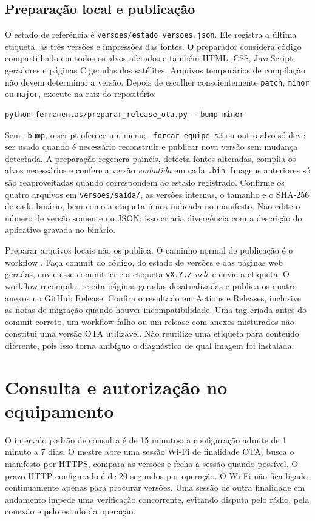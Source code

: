 \subsection{Preparação local e publicação}
O estado de referência é \texttt{versoes/estado\_versoes.json}. Ele registra a última etiqueta, as três versões e impressões das fontes. O preparador considera código compartilhado em todos os alvos afetados e também HTML, CSS, JavaScript, geradores e páginas C geradas dos satélites. Arquivos temporários de compilação não devem determinar a versão. Depois de escolher conscientemente \texttt{patch}, \texttt{minor} ou \texttt{major}, execute na raiz do repositório:
\begin{lstlisting}[caption={Preparação local do conjunto OTA}]
python ferramentas/preparar_release_ota.py --bump minor
\end{lstlisting}
Sem \texttt{--bump}, o script oferece um menu; \texttt{--forcar equipe-s3} ou outro alvo só deve ser usado quando é necessário reconstruir e publicar nova versão sem mudança detectada. A preparação regenera painéis, detecta fontes alteradas, compila os alvos necessários e confere a versão \emph{embutida} em cada \texttt{.bin}. Imagens anteriores só são reaproveitadas quando correspondem ao estado registrado. Confirme os quatro arquivos em \texttt{versoes/saida/}, as versões internas, o tamanho e o SHA-256 de cada binário, bem como a etiqueta única indicada no manifesto. Não edite o número de versão somente no JSON: isso criaria divergência com a descrição do aplicativo gravada no binário.

Preparar arquivos locais não os publica. O caminho normal de publicação é o workflow . Faça commit do código, do estado de versões e das páginas web geradas, envie esse commit, crie a etiqueta \texttt{vX.Y.Z} \emph{nele} e envie a etiqueta. O workflow recompila, rejeita páginas geradas desatualizadas e publica os quatro anexos no GitHub Release. Confira o resultado em Actions e Releases, inclusive as notas de migração quando houver incompatibilidade. Uma tag criada antes do commit correto, um workflow falho ou um release com anexos misturados não constitui uma versão OTA utilizável. Não reutilize uma etiqueta para conteúdo diferente, pois isso torna ambíguo o diagnóstico de qual imagem foi instalada.

\section{Consulta e autorização no equipamento}
O intervalo padrão de consulta é de 15 minutos; a configuração admite de 1 minuto a 7 dias. O mestre abre uma sessão Wi-Fi de finalidade OTA, busca o manifesto por HTTPS, compara as versões e fecha a sessão quando possível. O prazo HTTP configurado é de 20 segundos por operação. O Wi-Fi não fica ligado continuamente apenas para procurar versões. Uma sessão de outra finalidade em andamento impede uma verificação concorrente, evitando disputa pelo rádio, pela conexão e pelo estado da operação.

